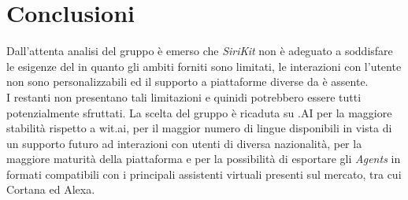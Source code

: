 \documentclass[a4paper,titlepage]{article}
\begin{document}
	\section{Conclusioni}
	Dall'attenta analisi del gruppo \GRUPPO{} è emerso che \textit{SiriKit} non è adeguato a soddisfare le esigenze del  \PROGETTO{} in quanto gli ambiti forniti sono limitati, le interazioni con l'utente non sono personalizzabili ed il supporto a piattaforme diverse da  è assente.\\
	I restanti  non presentano tali limitazioni e quinidi potrebbero essere tutti potenzialmente sfruttati. La scelta del gruppo è ricaduta su .AI per la maggiore stabilità rispetto a wit.ai, per il  maggior numero di lingue disponibili in vista di un supporto futuro ad interazioni con utenti di diversa nazionalità, per la maggiore maturità della piattaforma e per la possibilità di esportare gli \textit{Agents} in formati compatibili con i principali assistenti virtuali presenti sul mercato, tra cui Cortana ed Alexa.
	
	
	
\end{document}
